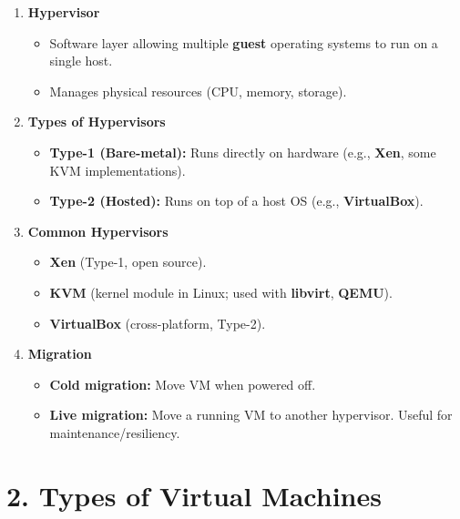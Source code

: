 \documentclass[12pt,a4paper]{report}
\begin{document}
\begin{enumerate}
    \item \textbf{Hypervisor}
    \begin{itemize}
        \item Software layer allowing multiple \textbf{guest} operating systems to run on a single host.
        \item Manages physical resources (CPU, memory, storage).
    \end{itemize}

    \item \textbf{Types of Hypervisors}
    \begin{itemize}
        \item \textbf{Type-1 (Bare-metal):} Runs directly on hardware (e.g., \textbf{Xen}, some KVM implementations).
        \item \textbf{Type-2 (Hosted):} Runs on top of a host OS (e.g., \textbf{VirtualBox}).
    \end{itemize}

    \item \textbf{Common Hypervisors}
    \begin{itemize}
        \item \textbf{Xen} (Type-1, open source).
        \item \textbf{KVM} (kernel module in Linux; used with \textbf{libvirt}, \textbf{QEMU}).
        \item \textbf{VirtualBox} (cross-platform, Type-2).
    \end{itemize}

    \item \textbf{Migration}
    \begin{itemize}
        \item \textbf{Cold migration:} Move VM when powered off.
        \item \textbf{Live migration:} Move a running VM to another hypervisor. Useful for maintenance/resiliency.
    \end{itemize}
\end{enumerate}

\section*{2. Types of Virtual Machines}
\end{document}
